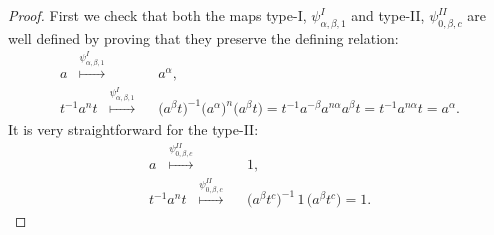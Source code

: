 \documentclass[a4paper]{amsart}
\theoremstyle{definition}
\begin{document}
\begin{proof}
First we check that both the maps type-I, $\psi^{I}_{\alpha, \beta, 1}$ and type-II, $\psi^{II}_{0, \beta, c}$ are well defined by proving that they preserve the defining relation:
%
 \begin{align*}
a \stackrel{\psi^I_{\alpha,\beta, 1}}{\quad \mapsto\quad} & a^{\alpha}, \\ 
t^{-1}a^nt \stackrel{\psi^I_{\alpha,\beta, 1}}{\quad \mapsto\quad} &\big( a^{\beta} t\big)^{-1} \big( a^{\alpha}\big)^n \big( a^{\beta} t\big)= t^{-1} a^{-\beta} a^{n\alpha} a^{\beta}t= t^{-1} a^{n\alpha} t =a^{\alpha}.
 \end{align*}
%
It is very straightforward for the type-II:
 \begin{align*}
a \stackrel{\psi^{II}_{0,\beta, c}}{\quad \mapsto\quad} & 1, \\ 
t^{-1}a^nt \stackrel{\psi^{II}_{0,\beta, c}}{\quad \mapsto\quad} &\big( a^{\beta} t^c\big)^{-1}\, 1\, \big( a^{\beta} t^c\big)= 1.
 \end{align*}
%


\end{proof}
\end{document}
